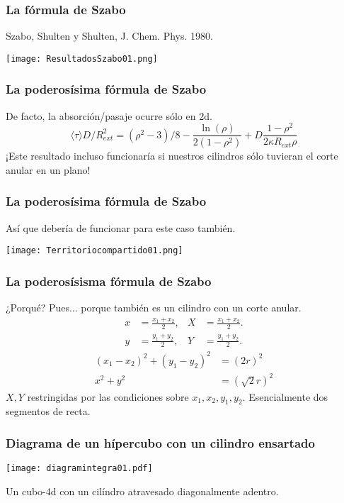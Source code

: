 \documentclass[mathserif,serif]{beamer}
\begin{document}
  \begin{frame}
    \frametitle{La fórmula de Szabo}
    Szabo, Shulten y Shulten, J. Chem. Phys. 1980.
     \begin{center}
      \texttt{[image: ResultadosSzabo01.png]}    
    \end{center}
  \end{frame}
  
  \begin{frame}
    \frametitle{La poderosísima fórmula de Szabo}
    De facto, la absorción/pasaje ocurre sólo en 2d. 
    \begin{equation}
      \langle \tau  \rangle D /R_{ext}^2=
      (\rho^2-3)/8-\frac{\ln(\rho)}{2(1-\rho^2)}+D\frac{1-\rho^2}{2\kappa R_{ext} \rho}
    \end{equation}
    ¡Este resultado incluso funcionaría si nuestros cilindros 
    sólo tuvieran el corte anular en un plano!
  \end{frame}

  \begin{frame}
    \frametitle{La poderosísima fórmula de Szabo}
    Así que debería de funcionar para este caso también.
    \begin{center}
      \texttt{[image: Territoriocompartido01.png]}    
    \end{center}
  \end{frame}

  \begin{frame}
    \frametitle{La poderosísisma fórmula de Szabo}
    ¿Porqué? Pues... porque también es un cilindro con un corte anular.
    \begin{align}
      x &= \frac{x_1+x_2}{2}, & X &= \frac{x_1+x_2}{2}. \\ 
      y &= \frac{y_1+y_2}{2}, & Y &= \frac{y_1+y_2}{2}.
    \end{align}
    \begin{align}
      (x_1-x_2)^2+(y_1-y_2)^2&=(2r)^2\\
      x^2  +y^2 &=  (\sqrt{2}r)^2
    \end{align}
  $X,Y$ restringidas por las condiciones sobre $x_1, x_2, y_1, y_2$.
  Esencialmente dos segmentos de recta. 
  \end{frame}
  
  \begin{frame}
    \frametitle{Diagrama de un hípercubo con un cilindro ensartado} 
    \begin{center}
      \texttt{[image: diagramintegra01.pdf]}    
    \end{center}
    Un cubo-4d con un cilíndro atravesado diagonalmente adentro.
  \end{frame}
  
\end{document}
